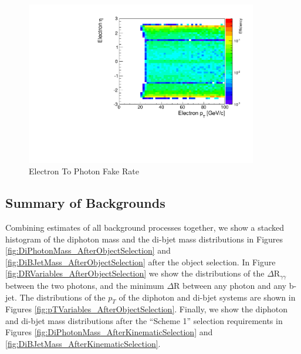 \documentclass{cmspaper}
\begin{document}
\begin{figure}[h]
  \centering
  \includegraphics[width=0.9\textwidth]{figures/EfficiencyPtEta_ElectronFakesPhoton.pdf}
  \caption{Electron To Photon Fake Rate}
  \label{fig:electronToPhotonFakerate}
\end{figure}


\subsection{Summary of Backgrounds}

Combining estimates of all background processes together, we show 
a stacked histogram of the diphoton mass and the di-bjet mass distributions
in Figures \ref{fig:DiPhotonMass_AfterObjectSelection} and 
\ref{fig:DiBJetMass_AfterObjectSelection} after the object selection. In Figure 
\ref{fig:DRVariables_AfterObjectSelection} we show the distributions of the $\Delta \mathrm{R}_{\gamma\gamma}$
between the two photons, and the minimum $\Delta$R between any photon and any b-jet.
The distributions of the $p_{T}$ of the diphoton and di-bjet systems are shown in 
Figures \ref{fig:pTVariables_AfterObjectSelection}. Finally, we show the 
diphoton and di-bjet mass distributions after the ``Scheme 1'' selection requirements in 
Figures \ref{fig:DiPhotonMass_AfterKinematicSelection}
and \ref{fig:DiBJetMass_AfterKinematicSelection}. 
\end{document}

